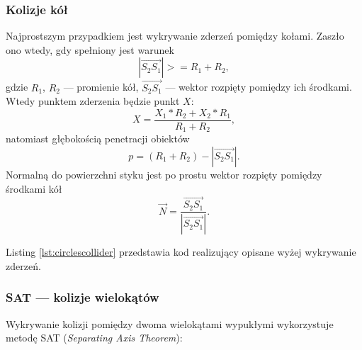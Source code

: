 



\subsubsection{Kolizje kół}
Najprostszym przypadkiem jest wykrywanie zderzeń pomiędzy kołami. Zaszło ono wtedy, gdy spełniony jest warunek
\begin{equation}
| \overrightarrow{S_2 S_1} | >= R_1+R_2,
\end{equation} gdzie
\newline
$R_1$, $R_2$ --- promienie kół, \newline
$\overrightarrow{S_2 S_1}$ --- wektor rozpięty pomiędzy ich środkami. Wtedy punktem zderzenia będzie punkt $X$:
\begin{equation}
X = \frac{X_1 * R_2 + X_2 * R_1}{R_1+R_2},
\end{equation} natomiast głębokością penetracji obiektów 
\begin{equation}
p = (R_1+R_2) - | \overrightarrow{S_2 S_1} |.
\end{equation}
Normalną do powierzchni styku jest po prostu wektor rozpięty pomiędzy środkami kół 
\begin{equation}
\vec{N} = \frac{\overrightarrow{S_2 S_1}}{|\overrightarrow{S_2 S_1}|}.
\end{equation}

Listing \ref{lst:circlescollider} przedstawia kod realizujący opisane wyżej wykrywanie zderzeń.



\subsubsection{SAT --- kolizje wielokątów}
\label{part:sat}
Wykrywanie kolizji pomiędzy dwoma wielokątami wypukłymi wykorzystuje metodę SAT (\textit{Separating Axis Theorem}):

